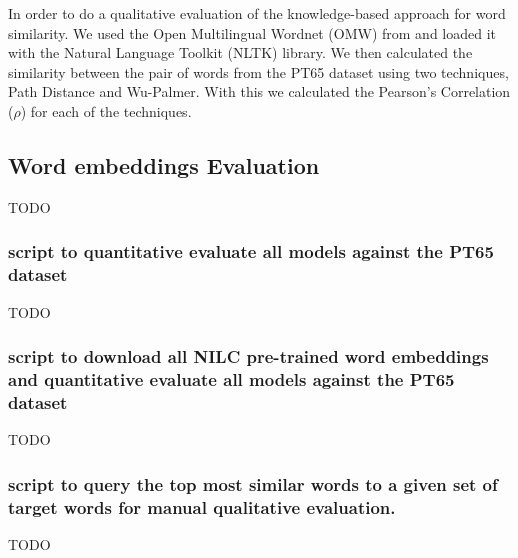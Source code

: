 In order to do a qualitative evaluation of the knowledge-based approach for word similarity. We used the Open Multilingual Wordnet (OMW) from  and loaded it with the Natural Language Toolkit (NLTK) library. We then calculated the similarity between the pair of words from the PT65 dataset using two techniques, Path Distance and Wu-Palmer. With this we calculated the Pearson’s Correlation ($\rho$) for each of the techniques.

\subsection{Word embeddings Evaluation}


TODO

\subsubsection{script to quantitative evaluate all models against the PT65 dataset}

TODO

\subsubsection{script to download all NILC pre-trained word embeddings and quantitative evaluate all models against the PT65 dataset}

TODO

\subsubsection{script to query the top most similar words to a given set of target words for manual qualitative evaluation.}

TODO

